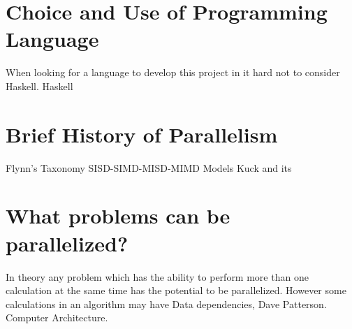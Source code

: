 \documentclass{report}
\begin{document}
\section{Choice and Use of Programming Language}

When looking for a language to develop this project in it hard not to consider Haskell. Haskell
%

\section {Brief History of Parallelism}
Flynn's Taxonomy
SISD-SIMD-MISD-MIMD
Models Kuck and its

\section {What problems can be parallelized?}
In theory any problem which has the ability to perform more than one calculation at the same time has the potential to be parallelized. However some calculations in an algorithm may have Data dependencies, 
Dave Patterson. Computer Architecture.
\end{document}
